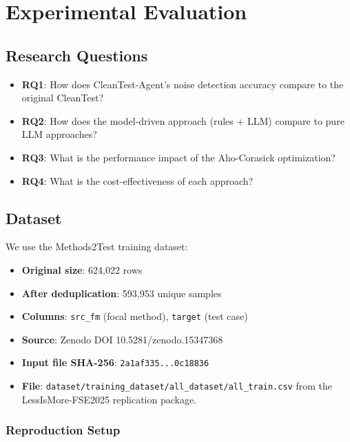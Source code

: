 \documentclass[acmlarge,nonacm,screen]{acmart}
\begin{document}
\section{Experimental Evaluation}
\label{sec:evaluation}

\subsection{Research Questions}

\begin{itemize}
    \item \textbf{RQ1}: How does CleanTest-Agent's noise detection accuracy compare to the original CleanTest?
    \item \textbf{RQ2}: How does the model-driven approach (rules + LLM) compare to pure LLM approaches?
    \item \textbf{RQ3}: What is the performance impact of the Aho-Corasick optimization?
    \item \textbf{RQ4}: What is the cost-effectiveness of each approach?
\end{itemize}

\subsection{Dataset}

We use the Methods2Test training dataset:
\begin{itemize}
    \item \textbf{Original size}: 624,022 rows
    \item \textbf{After deduplication}: 593,953 unique samples
    \item \textbf{Columns}: \texttt{src\_fm} (focal method), \texttt{target} (test case)
    \item \textbf{Source}: Zenodo DOI 10.5281/zenodo.15347368
    \item \textbf{Input file SHA-256}: \texttt{2a1af335...0c18836}
    \item \textbf{File}: \texttt{dataset/\allowbreak training\_dataset/\allowbreak all\_dataset/\allowbreak all\_train.csv} from the LessIsMore-FSE2025 replication package.
\end{itemize}

\subsubsection{Reproduction Setup}
\label{sec:reproduction-setup}
\end{document}
